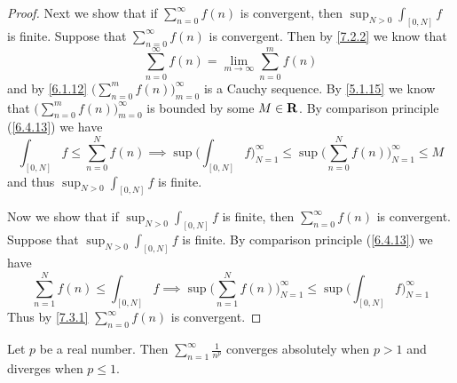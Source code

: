 \begin{proof}
  Next we show that if \(\sum_{n = 0}^\infty f(n)\) is convergent, then \(\sup_{N > 0} \int_{[0, N]} f\) is finite.
  Suppose that \(\sum_{n = 0}^\infty f(n)\) is convergent.
  Then by \cref{7.2.2} we know that
  \[
    \sum_{n = 0}^\infty f(n) = \lim_{m \to \infty} \sum_{n = 0}^m f(n)
  \]
  and by \cref{6.1.12} \(\big(\sum_{n = 0}^m f(n)\big)_{m = 0}^\infty\) is a Cauchy sequence.
  By \cref{5.1.15} we know that \(\big(\sum_{n = 0}^m f(n)\big)_{m = 0}^\infty\) is bounded by some \(M \in \mathbf{R}\).
  By comparison principle (\cref{6.4.13}) we have
  \[
    \int_{[0, N]} f \leq \sum_{n = 0}^N f(n) \implies \sup\bigg(\int_{[0, N]} f\bigg)_{N = 1}^\infty \leq \sup\bigg(\sum_{n = 0}^N f(n)\bigg)_{N = 1}^\infty \leq M
  \]
  and thus \(\sup_{N > 0} \int_{[0, N]} f\) is finite.

  Now we show that if \(\sup_{N > 0} \int_{[0, N]} f\) is finite, then \(\sum_{n = 0}^\infty f(n)\) is convergent.
  Suppose that \(\sup_{N > 0} \int_{[0, N]} f\) is finite.
  By comparison principle (\cref{6.4.13}) we have
  \[
    \sum_{n = 1}^N f(n) \leq \int_{[0, N]} f \implies \sup\bigg(\sum_{n = 1}^N f(n)\bigg)_{N = 1}^\infty \leq \sup\bigg(\int_{[0, N]} f\bigg)_{N = 1}^\infty
  \]
  Thus by \cref{7.3.1} \(\sum_{n = 0}^\infty f(n)\) is convergent.
\end{proof}

\begin{corollary}\label{11.6.5}
  Let \(p\) be a real number.
  Then \(\sum_{n = 1}^\infty \frac{1}{n^p}\) converges absolutely when \(p > 1\) and diverges when \(p \leq 1\).
\end{corollary}

